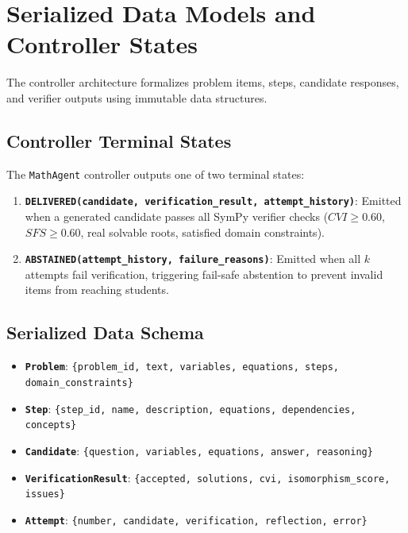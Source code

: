 \documentclass[11pt,letterpaper]{article}
\begin{document}
\section{Serialized Data Models and Controller States}\label{sec:data-models}

The controller architecture formalizes problem items, steps, candidate responses, and verifier outputs using immutable data structures.

\subsection{Controller Terminal States}
The \texttt{MathAgent} controller outputs one of two terminal states:
\begin{enumerate}
    \item \textbf{\texttt{DELIVERED(candidate, verification\_result, attempt\_history)}}: Emitted when a generated candidate passes all SymPy verifier checks ($CVI \ge 0.60$, $SFS \ge 0.60$, real solvable roots, satisfied domain constraints).
    \item \textbf{\texttt{ABSTAINED(attempt\_history, failure\_reasons)}}: Emitted when all $k$ attempts fail verification, triggering fail-safe abstention to prevent invalid items from reaching students.
\end{enumerate}

\subsection{Serialized Data Schema}
\begin{itemize}
    \item \textbf{\texttt{Problem}}: \texttt{\{problem\_id, text, variables, equations, steps, domain\_constraints\}}
    \item \textbf{\texttt{Step}}: \texttt{\{step\_id, name, description, equations, dependencies, concepts\}}
    \item \textbf{\texttt{Candidate}}: \texttt{\{question, variables, equations, answer, reasoning\}}
    \item \textbf{\texttt{VerificationResult}}: \texttt{\{accepted, solutions, cvi, isomorphism\_score, issues\}}
    \item \textbf{\texttt{Attempt}}: \texttt{\{number, candidate, verification, reflection, error\}}
\end{itemize}

\end{document}
